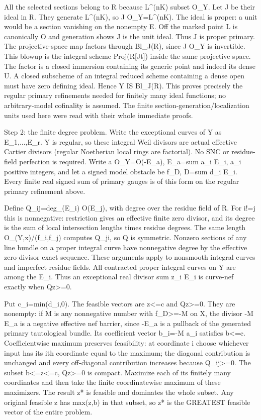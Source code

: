 \documentclass[11pt]{article}
\begin{document}
All the selected sections belong to R because L\textasciicircum{}(nK) subset O\_Y. Let J be their ideal in R. They generate L\textasciicircum{}(nK), so J O\_Y=L\textasciicircum{}(nK). The ideal is proper: a unit would be a section vanishing on the nonempty E. Off the marked point L is canonically O and generation shows J is the unit ideal. Thus J is proper primary. The projective-space map factors through Bl\_J(R), since J O\_Y is invertible. This blowup is the integral scheme Proj(R[Jt]) inside the same projective space. The factor is a closed immersion containing its generic point and indeed its dense U. A closed subscheme of an integral reduced scheme containing a dense open must have zero defining ideal. Hence Y IS Bl\_J(R). This proves precisely the regular primary refinements needed for finitely many ideal functions; no arbitrary-model cofinality is assumed. The finite section-generation/localization units used here were read with their whole immediate proofs.

Step 2: the finite degree problem. Write the exceptional curves of Y as E\_1,...,E\_r. Y is regular, so these integral Weil divisors are actual effective Cartier divisors (regular Noetherian local rings are factorial). No SNC or residue-field perfection is required. Write a O\_Y=O(-E\_a), E\_a=sum a\_i E\_i, a\_i positive integers, and let a signed model obstacle be f\_D, D=sum d\_i E\_i. Every finite real signed sum of primary gauges is of this form on the regular primary refinement above.

Define Q\_ij=deg\_(E\_i) O(E\_j), with degree over the residue field of R. For i!=j this is nonnegative: restriction gives an effective finite zero divisor, and its degree is the sum of local intersection lengths times residue degrees. The same length O\_(Y,x)/(f\_i,f\_j) computes Q\_ji, so Q is symmetric. Nonzero sections of any line bundle on a proper integral curve have nonnegative degree by the effective zero-divisor exact sequence. These arguments apply to nonsmooth integral curves and imperfect residue fields. All contracted proper integral curves on Y are among the E\_i. Thus an exceptional real divisor sum z\_i E\_i is curve-nef exactly when Qz>=0.

Put c\_i=min(d\_i,0). The feasible vectors are z<=c and Qz>=0. They are nonempty: if M is any nonnegative number with f\_D>=-M on X, the divisor -M E\_a is a negative effective nef barrier, since -E\_a is a pullback of the generated primary tautological bundle. Its coefficient vector b\_i=-M a\_i satisfies b<=c. Coefficientwise maximum preserves feasibility: at coordinate i choose whichever input has its ith coordinate equal to the maximum; the diagonal contribution is unchanged and every off-diagonal contribution increases because Q\_ij>=0. The subset b<=z<=c, Qz>=0 is compact. Maximize each of its finitely many coordinates and then take the finite coordinatewise maximum of these maximizers. The result z* is feasible and dominates the whole subset. Any original feasible z has max(z,b) in that subset, so z* is the GREATEST feasible vector of the entire problem.
\end{document}

